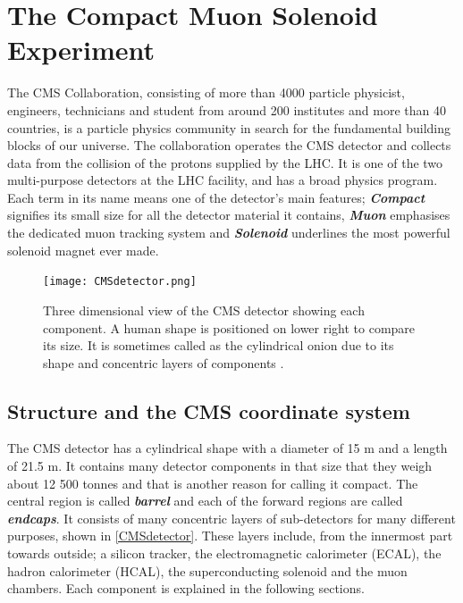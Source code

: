 \section{The Compact Muon Solenoid Experiment}

The CMS Collaboration, consisting of more than 4000 particle physicist, engineers, technicians and student from around 200 institutes and more than 40 countries, is a  particle physics community in search for the fundamental building blocks of our universe. The collaboration operates the CMS detector and collects data from the collision of the protons supplied by the LHC. It is one of the two multi-purpose detectors at the LHC facility, and has a broad physics program. Each term in its name means one of the detector's main features; \textbf{\emph{Compact}} signifies its small size for all the detector material it contains, \textbf{\emph{Muon}} emphasises the dedicated muon tracking system and \textbf{\emph{Solenoid}} underlines the most powerful solenoid magnet ever made.

\begin{figure}[ht]
	\centering
	\texttt{[image: CMSdetector.png]}
	\vspace{2mm}
	\caption[Three dimensional view of the CMS detector showing each component. A human shape is positioned on lower right to compare its size. It is sometimes called as the cylindrical onion due to its shape and concentric layers of components.]
	{Three dimensional view of the CMS detector showing each component. A human shape is positioned on lower right to compare its size. It is sometimes called as the cylindrical onion due to its shape and concentric layers of components \cite{CMSdetector}.}
	\label{CMSdetector}
\end{figure}

\subsection{Structure and the CMS coordinate system}

The CMS detector has a cylindrical shape with a diameter of 15 m and a length of 21.5 m. It contains many detector components in that size that they weigh about 12 500 tonnes and that is another reason for calling it compact. The central region is called \textbf{\emph{barrel}} and each of the forward regions are called \textbf{\emph{endcaps}}. It consists of many concentric layers of sub-detectors for many different purposes, shown in \autoref{CMSdetector}. These layers include, from the innermost part towards outside; a silicon tracker, the electromagnetic calorimeter (ECAL), the hadron calorimeter (HCAL), the superconducting solenoid and the muon chambers. Each component is explained in the following sections. 


